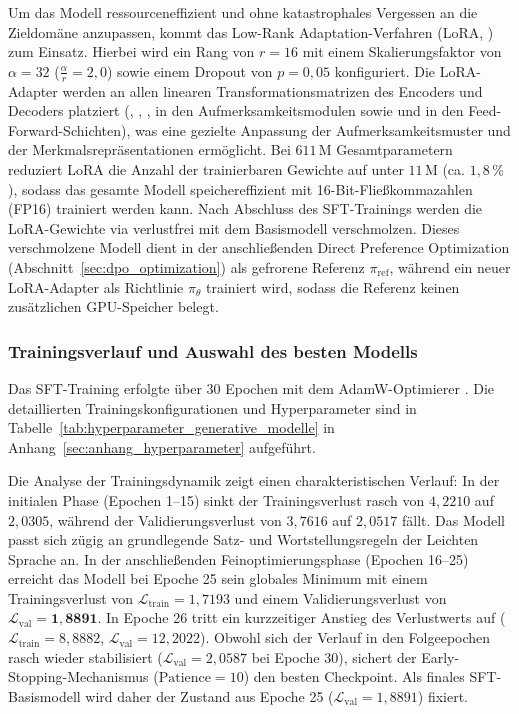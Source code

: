 Um das Modell ressourceneffizient und ohne katastrophales Vergessen an die Zieldomäne anzupassen, kommt das Low-Rank Adaptation-Verfahren (LoRA, \citet{hu2022lora}) zum Einsatz. Hierbei wird ein Rang von $r = 16$ mit einem Skalierungsfaktor von $\alpha = 32$ ($\frac{\alpha}{r} = 2{,}0$) sowie einem Dropout von $p = 0{,}05$ konfiguriert. Die LoRA-Adapter werden an allen linearen Transformationsmatrizen des Encoders und Decoders platziert (, , ,  in den Aufmerksamkeitsmodulen sowie  und  in den Feed-Forward-Schichten), was eine gezielte Anpassung der Aufmerksamkeitsmuster und der Merkmalsrepräsentationen ermöglicht. Bei $611\,\text{M}$ Gesamtparametern reduziert LoRA die Anzahl der trainierbaren Gewichte auf unter $11\,\text{M}$ (ca. $1{,}8\,\%$), sodass das gesamte Modell speichereffizient mit 16-Bit-Fließkommazahlen (FP16) trainiert werden kann. Nach Abschluss des SFT-Trainings werden die LoRA-Gewichte via  verlustfrei mit dem Basismodell verschmolzen. Dieses verschmolzene Modell dient in der anschließenden Direct Preference Optimization (Abschnitt~\ref{sec:dpo_optimization}) als gefrorene Referenz $\pi_{\text{ref}}$, während ein neuer LoRA-Adapter als Richtlinie $\pi_\theta$ trainiert wird, sodass die Referenz keinen zusätzlichen GPU-Speicher belegt.

\subsubsection{Trainingsverlauf und Auswahl des besten Modells}
\label{sec:sft_trainingsdynamik}

Das SFT-Training erfolgte über $30$ Epochen mit dem AdamW-Optimierer \citep{loshchilov2019decoupled}. Die detaillierten Trainingskonfigurationen und Hyperparameter sind in Tabelle~\ref{tab:hyperparameter_generative_modelle} in Anhang~\ref{sec:anhang_hyperparameter} aufgeführt.

Die Analyse der Trainingsdynamik zeigt einen charakteristischen Verlauf: In der initialen Phase (Epochen 1--15) sinkt der Trainingsverlust rasch von $4{,}2210$ auf $2{,}0305$, während der Validierungsverlust von $3{,}7616$ auf $2{,}0517$ fällt. Das Modell passt sich zügig an grundlegende Satz- und Wortstellungsregeln der Leichten Sprache an. In der anschließenden Feinoptimierungsphase (Epochen 16--25) erreicht das Modell bei Epoche 25 sein globales Minimum mit einem Trainingsverlust von $\mathcal{L}_{\text{train}} = 1{,}7193$ und einem Validierungsverlust von $\mathcal{L}_{\text{val}} = \mathbf{1{,}8891}$. In Epoche 26 tritt ein kurzzeitiger Anstieg des Verlustwerts auf ($\mathcal{L}_{\text{train}} = 8{,}8882$, $\mathcal{L}_{\text{val}} = 12{,}2022$). Obwohl sich der Verlauf in den Folgeepochen rasch wieder stabilisiert ($\mathcal{L}_{\text{val}} = 2{,}0587$ bei Epoche 30), sichert der Early-Stopping-Mechanismus ($\text{Patience} = 10$) den besten Checkpoint. Als finales SFT-Basismodell wird daher der Zustand aus Epoche 25 ($\mathcal{L}_{\text{val}} = 1{,}8891$) fixiert.

